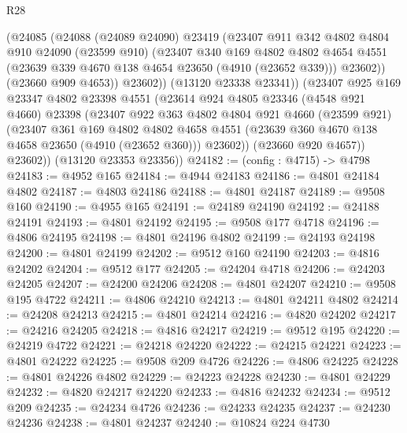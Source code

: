 \begin{lexlean}{R28}
\begin{coremodule}
            (@24085
              (@24088
                (@24089 @24090)
                @23419
                (@23407
                  @911
                  @342
                  @4802
                  @4804
                  @910
                  @24090
                  (@23599 @910)
                  (@23407
                    @340
                    @169
                    @4802
                    @4802
                    @4654
                    @4551
                    (@23639 @339 @4670 @138 @4654 @23650 (@4910 (@23652 @339)))
                    @23602))
                (@23660 @909 @4653))
              @23602))
          (@13120 @23338 @23341))
        (@23407
          @925
          @169
          @23347
          @4802
          @23398
          @4551
          (@23614
            @924
            @4805
            @23346
            (@4548 @921 @4660)
            @23398
            (@23407
              @922
              @363
              @4802
              @4804
              @921
              @4660
              (@23599 @921)
              (@23407
                @361
                @169
                @4802
                @4802
                @4658
                @4551
                (@23639 @360 @4670 @138 @4658 @23650 (@4910 (@23652 @360)))
                @23602))
            (@23660 @920 @4657))
          @23602))
      (@13120 @23353 @23356))
@24182 := (config : @4715) -> @4798
@24183 := @4952 @165
@24184 := @4944 @24183
@24186 := @4801 @24184 @4802
@24187 := @4803 @24186
@24188 := @4801 @24187
@24189 := @9508 @160
@24190 := @4955 @165
@24191 := @24189 @24190
@24192 := @24188 @24191
@24193 := @4801 @24192
@24195 := @9508 @177 @4718
@24196 := @4806 @24195
@24198 := @4801 @24196 @4802
@24199 := @24193 @24198
@24200 := @4801 @24199
@24202 := @9512 @160 @24190
@24203 := @4816 @24202
@24204 := @9512 @177
@24205 := @24204 @4718
@24206 := @24203 @24205
@24207 := @24200 @24206
@24208 := @4801 @24207
@24210 := @9508 @195 @4722
@24211 := @4806 @24210
@24213 := @4801 @24211 @4802
@24214 := @24208 @24213
@24215 := @4801 @24214
@24216 := @4820 @24202
@24217 := @24216 @24205
@24218 := @4816 @24217
@24219 := @9512 @195
@24220 := @24219 @4722
@24221 := @24218 @24220
@24222 := @24215 @24221
@24223 := @4801 @24222
@24225 := @9508 @209 @4726
@24226 := @4806 @24225
@24228 := @4801 @24226 @4802
@24229 := @24223 @24228
@24230 := @4801 @24229
@24232 := @4820 @24217 @24220
@24233 := @4816 @24232
@24234 := @9512 @209
@24235 := @24234 @4726
@24236 := @24233 @24235
@24237 := @24230 @24236
@24238 := @4801 @24237
@24240 := @10824 @224 @4730

\end{coremodule}
\end{lexlean}
